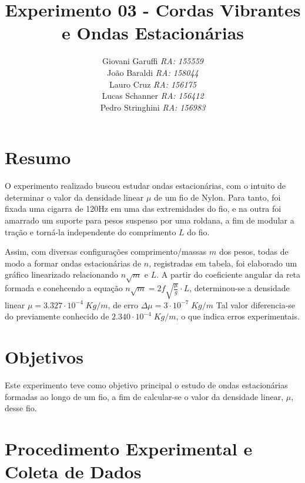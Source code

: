 \documentclass[12pt,a4paper]{article}
\begin{document}
\title{\vspace{70mm}\Huge Experimento 03 - Cordas Vibrantes e Ondas Estacionárias}
\author{ Giovani Garuffi\qquad\hfill
		\textit {RA: 155559}\protect\\
		João Baraldi\hfill
		\textit{RA: 158044}\protect\\
		Lauro Cruz\hfill
		\textit{RA: 156175}\protect\\
		Lucas Schanner\hfill
		\textit{RA: 156412}\protect\\
		Pedro Stringhini\hfill
		\textit {RA: 156983}								
		}
\maketitle
\newpage
\section{Resumo}
O experimento realizado buscou estudar ondas estacionárias, com o intuito de determinar o valor da densidade linear $\mu$ de um fio de Nylon. Para tanto, foi fixada uma cigarra de 120Hz em uma das extremidades do fio, e na outra foi amarrado um suporte para pesos suspenso por uma roldana, a fim de modular a tração e torná-la independente do comprimento $L$ do fio. 

Assim, com diversas configurações comprimento/massas $m$ dos pesos, todas de modo a formar ondas estacionárias de $n$, registradas em tabela,  foi elaborado um gráfico linearizado relacionando $n\sqrt{m}$ e $L$.  A partir do coeficiente angular da reta formada e conehcendo a equação $ n \sqrt{m} = 2f\sqrt{\frac{\mu}{g}} \cdot L $, determinou-se a densidade linear $ \mu = 3.327 \cdot 10^{-4} \; Kg/m$, de erro $\Delta \mu = 3 \cdot 10^{-7} \; Kg/m$ Tal valor diferencia-se do previamente conhecido de $2.340 \cdot 10^{-4} \; Kg/m$, o que indica erros experimentais.
\section{Objetivos}
Este experimento teve como objetivo principal o estudo de ondas estacionárias formadas ao longo de um fio, a fim de calcular-se o valor da densidade linear, $\mu$, desse fio.

\section{Procedimento Experimental e Coleta de Dados}
\end{document}
